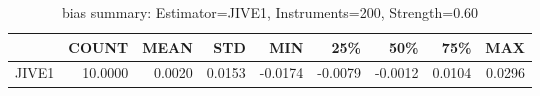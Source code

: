 \begin{table}[ht]
\centering
\caption{bias summary: Estimator=JIVE1, Instruments=200, Strength=0.60}
\begin{tabular}{lrrrrrrrr}
\toprule
 & COUNT & MEAN & STD & MIN & 25\% & 50\% & 75\% & MAX \\
\midrule
JIVE1 & 10.0000 & 0.0020 & 0.0153 & -0.0174 & -0.0079 & -0.0012 & 0.0104 & 0.0296 \\
\bottomrule
\end{tabular}
\end{table}
